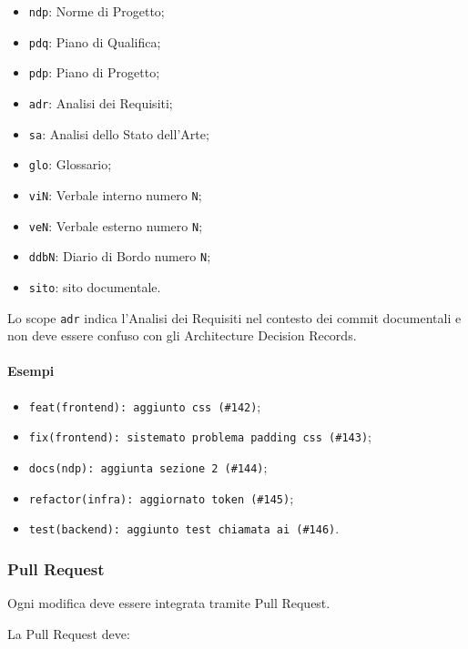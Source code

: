 \begin{itemize}
    \item \texttt{ndp}: Norme di Progetto;
    \item \texttt{pdq}: Piano di Qualifica;
    \item \texttt{pdp}: Piano di Progetto;
    \item \texttt{adr}: Analisi dei Requisiti;
    \item \texttt{sa}: Analisi dello Stato dell'Arte;
    \item \texttt{glo}: Glossario;
    \item \texttt{viN}: Verbale interno numero \texttt{N};
    \item \texttt{veN}: Verbale esterno numero \texttt{N};
    \item \texttt{ddbN}: Diario di Bordo numero \texttt{N};
    \item \texttt{sito}: sito documentale.
\end{itemize}

Lo scope \texttt{adr} indica l'Analisi dei Requisiti nel contesto dei commit
documentali e non deve essere confuso con gli Architecture Decision Records.

\paragraph{Esempi}

\begin{itemize}
    \item \texttt{feat(frontend): aggiunto css (\#142)};
    \item \texttt{fix(frontend): sistemato problema padding css (\#143)};
    \item \texttt{docs(ndp): aggiunta sezione 2 (\#144)};
    \item \texttt{refactor(infra): aggiornato token (\#145)};
    \item \texttt{test(backend): aggiunto test chiamata ai (\#146)}.
\end{itemize}


\subsubsection{Pull Request}

Ogni modifica deve essere integrata tramite Pull Request.

La Pull Request deve:

